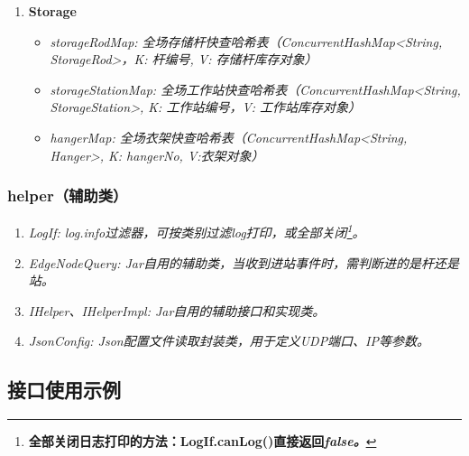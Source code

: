 \begin{enumerate}[label=\arabic*)]
\begin{itemize}
			\item \it{HANGER\_STATE\_PLACEHOLDER}: (999,"PLACEHOLDER","占位符（不使用）")
		\end{itemize}
		\item \bf{Storage}\label{sec:param-storage}
		\begin{itemize}
			\item \it{storageRodMap}: 全场存储杆快查哈希表（ConcurrentHashMap<String, StorageRod>，K: 杆编号, V: 存储杆库存对象）
			\item \it{storageStationMap}: 全场工作站快查哈希表（ConcurrentHashMap<String, StorageStation>, K: 工作站编号，V: 工作站库存对象）
			\item \it{hangerMap}: 全场衣架快查哈希表（ConcurrentHashMap<String, Hanger>, K: hangerNo, V:衣架对象）
		\end{itemize}
	\end{enumerate}
\subsubsection{helper（辅助类）}
	\begin{enumerate}[label=\arabic*)]
		\item \it{LogIf}: log.info过滤器，可按类别过滤log打印，或全部关闭\footnote{\bf{全部关闭日志打印的方法}：LogIf.canLog()直接返回\it{false}。}。
		\item \it{EdgeNodeQuery}: Jar自用的辅助类，当收到进站事件时，需判断进的是杆还是站。
		\item \it{IHelper、IHelperImpl}: Jar自用的辅助接口和实现类。
		\item \it{JsonConfig}: Json配置文件读取封装类，用于定义UDP端口、IP等参数。
	\end{enumerate}
\subsection{接口使用示例}
